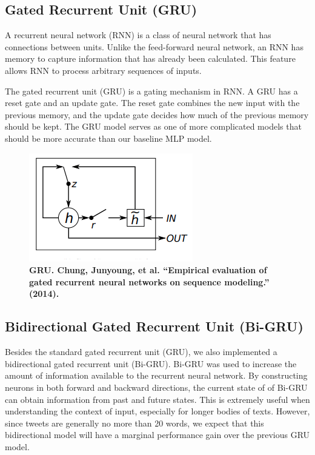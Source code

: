 \documentclass[11pt,a4paper]{article}
\begin{document}
	
	
	\subsection{Gated Recurrent Unit (GRU)}
	A recurrent neural network (RNN) is a class of neural network that has connections between units. Unlike the feed-forward neural network, an RNN has memory to capture information that has already been calculated. This feature allows RNN to process arbitrary sequences of inputs. 
	\par
	The gated recurrent unit (GRU) is a gating mechanism in RNN. A GRU has a reset gate and an update gate. The reset gate combines the new input with the previous memory, and the update gate decides how much of the previous memory should be kept. The GRU model serves as one of more complicated models that should be more accurate than our baseline MLP model.
	
	\begin{figure}[H]
		\centering\includegraphics[scale=0.7]{gru} 
		\caption{\textbf{ GRU. Chung, Junyoung, et al. “Empirical evaluation of gated recurrent neural networks on sequence modeling.” (2014).}}
	\end{figure}

	
	
	
	\subsection{Bidirectional Gated Recurrent Unit (Bi-GRU)}
	\label{sect:pdf}
	
	Besides the standard gated recurrent unit (GRU), we also implemented a bidirectional gated recurrent unit (Bi-GRU). Bi-GRU was used to increase the amount of information available to the recurrent neural network. By constructing neurons in both forward and backward directions, the current state of of Bi-GRU can obtain information from past and future states. This is extremely useful when understanding the context of input, especially for longer bodies of texts. However, since tweets are generally no more than 20 words, we expect that this bidirectional model will have a marginal performance gain over the previous GRU model.
	
\end{document}
